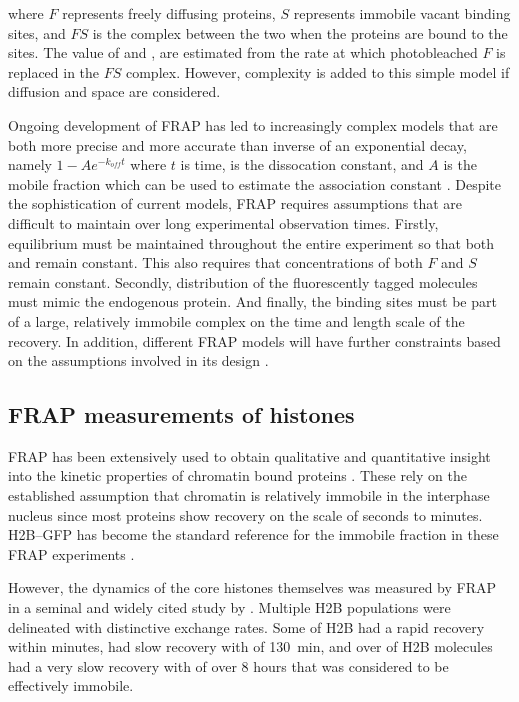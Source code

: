     where $F$ represents freely diffusing proteins,
    $S$ represents immobile vacant binding sites,
    and $FS$ is the complex between the two when the
    proteins are bound to the sites.
    The value of \kon{} and \koff{},
    are estimated from the rate at which photobleached $F$
    is replaced in the $FS$ complex.
    However, complexity is added to this simple model if
    diffusion and space are considered.

    Ongoing development of FRAP has led to increasingly complex models
    that are both more precise and more accurate than
    inverse of an exponential decay, namely $1 - Ae^{-k_{off}t}$ where
    $t$ is time, \koff{} is the dissocation constant, and $A$ is the
    mobile fraction which can be used to estimate the association
    constant \kon{} \citep{mcnally-frap-2010}.
    Despite the sophistication of current models, FRAP requires assumptions
    that are difficult to maintain over long experimental observation times.
    Firstly, equilibrium must be maintained throughout the entire experiment
    so that both \kon{} and \koff{} remain constant.
    This also requires that concentrations of both $F$ and $S$ remain constant.
    Secondly, distribution of the fluorescently tagged molecules
    must mimic the endogenous protein.
    And finally, the binding sites must be part of a large,
    relatively immobile complex
    on the time and length scale of the recovery.
    In addition, different FRAP models will have further constraints
    based on the assumptions involved in its design \citep{mcnally-frap-2010}.

  \subsection{FRAP measurements of histones}

    FRAP has been extensively used to obtain qualitative and
    quantitative insight into the kinetic properties of chromatin bound
    proteins \citep{phair2000high, essers2005nuclear, agresti2005gr}.
    These rely on the established assumption that chromatin is
    relatively immobile in the interphase nucleus
    \citep{abney1997chromatin} since most proteins show recovery
    on the scale of seconds to minutes.
    H2B--GFP \citep{KevinH2BGFP} has become
    the standard reference for the immobile fraction in these
    FRAP experiments \citep{dey2000bromodomain, kuipers2011highly,
    jullien2016chromatibody}.

    However, the dynamics of the core histones themselves
    was measured by FRAP in a seminal
    and widely cited study by \citet{KimuraCook}. Multiple H2B
    populations were delineated with distinctive exchange rates.  Some
     of H2B had a rapid recovery within minutes, 
    had slow recovery with \halflife[] of \SI{130}{\minute},
    and over  of H2B molecules had a
    very slow recovery with \halflife[] of
    over 8 hours that was considered to be effectively immobile.


